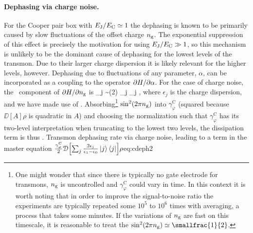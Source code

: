 \paragraph{Dephasing via charge noise.}  For the Cooper pair box with $E_{\text{J}}/E_{\text{C}}\simeq 1$ the dephasing is known to be primarily caused by slow fluctuations of the offset charge $n_{\text{g}}$. The exponential suppression of this effect is precisely the motivation for using $E_{\text{J}}/E_{\text{C}}\gg1$, so this  mechanism is unlikely to be the dominant cause of dephasing for the lowest levels of the transmon. Due to their larger charge dispersion it is likely relevant for the higher levels, however. Dephasing due to fluctuations of any parameter, $\alpha$, can be incorporated as a coupling to the operator $\partial H/\partial \alpha$. For the case of charge noise, the \dc\ component of $\partial H/\partial n_{\text{g}}$ is
\be
    \label{eq:cdeph}
    \sum_j  \sim \sin(2\pi\ngate) \sum_j \epsilon_j ,
\ee
where $\epsilon_j$ is the charge dispersion, and we have made use of . Absorbing\footnote{One might wonder that since there is typically no gate electrode for transmons, $n_{\text{g}}$ is uncontrolled and $\gamma_\varphi^\text{C}$ could vary in time. In this context it is worth noting that in order to improve the signal-to-noise ratio the experiments are typically repeated some $10^5$ to $10^6$ times with averaging, a process that takes some minutes. If the variations of $n_{\text{g}}$ are fast on this timescale, it is reasonable to treat the $\sin^2(2\pi\ngate)\simeq\smallfrac{1}{2}$.}  $\sin^2(2\pi n_{\text{g}})$ into $\gamma_\varphi^\text{C}$ (squared because $\DD[A]\rho$ is quadratic in $A$) and choosing the normalization such that $\gamma_\varphi^\text{C}$ has its two-level interpretation when truncating to the lowest two levels, the dissipation term is thus
\be
    \label{eq:cdeph2}
     \DD{}\rho .
\ee%
    {Transmon dephasing rate via charge noise, leading to a term in the master equation $\frac{\gamma_\varphi^{\text{C}}}{2} \mathcal{D}\Bigl[\sum_j\frac{2\epsilon_j}{\epsilon_1-\epsilon_0}\left\lvert j \right\rangle\left\langle j \right\rvert\Bigr]\rho$}{eq:cdeph2}

